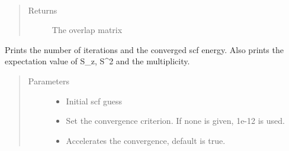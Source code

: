 \documentclass[letterpaper,10pt,english]{sphinxmanual}
\begin{document}
\begin{fulllineitems}
\begin{fulllineitems}
\begin{quote}
\begin{description}
\end{description}\end{quote}

\end{fulllineitems}


\begin{fulllineitems}
\label{\detokenize{cUHF_s:hf.HartreeFock.cUHF_s.MF.get_ovlp}}~\begin{quote}\begin{description}
\item[{Returns}] \leavevmode
The overlap matrix

\end{description}\end{quote}

\end{fulllineitems}


\begin{fulllineitems}
\label{\detokenize{cUHF_s:hf.HartreeFock.cUHF_s.MF.get_scf_solution}}
Prints the number of iterations and the converged scf energy.
Also prints the expectation value of S\_z, S\textasciicircum{}2 and the multiplicity.
\begin{quote}\begin{description}
\item[{Parameters}] \leavevmode\begin{itemize}
\item {} 
 \textendash{} Initial scf guess

\item {} 
 \textendash{} Set the convergence criterion. If none is given, 1e-12 is used.

\item {} 
 \textendash{} Accelerates the convergence, default is true.

\end{itemize}


\end{description}
\end{quote}
\end{fulllineitems}
\end{fulllineitems}
\end{document}
